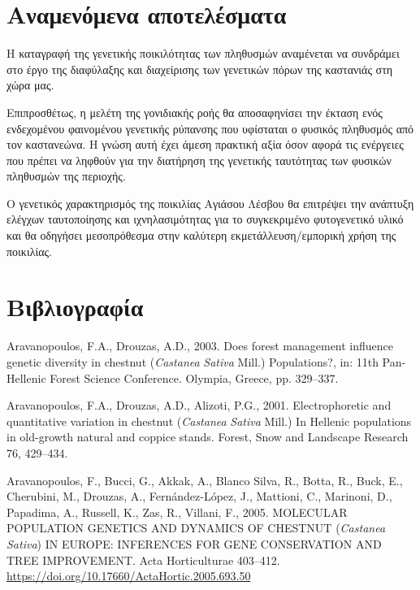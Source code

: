 \documentclass[12pt,a4paper,]{report}
\begin{document}
\hypertarget{-}{%
\section{Αναμενόμενα αποτελέσματα}\label{-}}

H καταγραφή της γενετικής ποικιλότητας των πληθυσμών αναμένεται να
συνδράμει στο έργο της διαφύλαξης και διαχείρισης των γενετικών πόρων
της καστανιάς στη χώρα μας.

Επιπροσθέτως, η μελέτη της γονιδιακής ροής θα αποσαφηνίσει την έκταση
ενός ενδεχομένου φαινομένου γενετικής ρύπανσης που υφίσταται ο φυσικός
πληθυσμός από τον καστανεώνα. Η γνώση αυτή έχει άμεση πρακτική αξία όσον
αφορά τις ενέργειες που πρέπει να ληφθούν για την διατήρηση της
γενετικής ταυτότητας των φυσικών πληθυσμών της περιοχής.

Ο γενετικός χαρακτηρισμός της ποικιλίας Αγιάσου Λέσβου θα επιτρέψει την
ανάπτυξη ελέγχων ταυτοποίησης και ιχνηλασιμότητας για το συγκεκριμένο
φυτογενετικό υλικό και θα οδηγήσει μεσοπρόθεσμα στην καλύτερη
εκμετάλλευση/εμπορική χρήση της ποικιλίας.

\section{Βιβλιογραφία}

\hypertarget{refs}{}
\leavevmode\hypertarget{ref-aravanopoulos_does_2003}{}%
Aravanopoulos, F.A., Drouzas, A.D., 2003. Does forest management
influence genetic diversity in chestnut (\emph{Castanea} \emph{Sativa}
Mill.) Populations?, in: 11th Pan-Hellenic Forest Science Conference.
Olympia, Greece, pp. 329--337.

\leavevmode\hypertarget{ref-Aravanopoulos2001}{}%
Aravanopoulos, F.A., Drouzas, A.D., Alizoti, P.G., 2001. Electrophoretic
and quantitative variation in chestnut (\emph{Castanea} \emph{Sativa}
Mill.) In Hellenic populations in old-growth natural and coppice stands.
Forest, Snow and Landscape Research 76, 429--434.

\leavevmode\hypertarget{ref-aravanopoulos_molecular_2005}{}%
Aravanopoulos, F., Bucci, G., Akkak, A., Blanco Silva, R., Botta, R.,
Buck, E., Cherubini, M., Drouzas, A., Fernández-López, J., Mattioni, C.,
Marinoni, D., Papadima, A., Russell, K., Zas, R., Villani, F., 2005.
MOLECULAR POPULATION GENETICS AND DYNAMICS OF CHESTNUT (\emph{Castanea}
\emph{Sativa}) IN EUROPE: INFERENCES FOR GENE CONSERVATION AND TREE
IMPROVEMENT. Acta Horticulturae 403--412.
\url{https://doi.org/10.17660/ActaHortic.2005.693.50}
\end{document}
